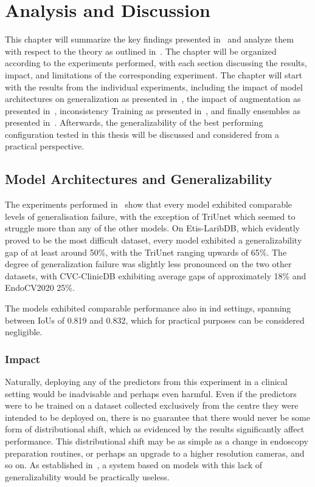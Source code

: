 \chapter{Analysis and Discussion}\label{discussion}
This chapter will summarize the key findings presented in~ and analyze them with respect to the theory as outlined in~. The chapter will be organized according to the experiments performed, with each section discussing the results, impact, and limitations of the corresponding experiment. The chapter will start with the results from the individual experiments, including the impact of model architectures on generalization as presented in~, the impact of augmentation as presented in~, inconsistency Training as presented in~, and finally ensembles as presented in~. Afterwards, the generalizability of the best performing configuration tested in this thesis will be discussed and considered from a practical perspective.


\section{Model Architectures and Generalizability}\label{discussion:models}
The experiments performed in~ show that every model exhibited comparable levels of generalisation failure, with the exception of TriUnet which seemed to struggle more than any of the other models. On Etis-LaribDB, which evidently proved to be the most difficult dataset, every model exhibited a generalizability gap of at least around 50\%, with the TriUnet ranging upwards of 65\%. The degree of generalization failure was slightly less pronounced on the two other datasets, with CVC-ClinicDB exhibiting average gaps of approximately 18\% and EndoCV2020 25\%. 

The models exhibited comparable performance also in \gls{ind} settings, spanning between IoUs of 0.819 and 0.832, which for practical purposes can be considered negligible. 

\subsection{Impact}
Naturally, deploying any of the predictors from this experiment in a clinical setting would be inadvisable and perhaps even harmful. Even if the predictors were to be trained on a dataset collected exclusively from the centre they were intended to be deployed on, there is no guarantee that there would never be some form of distributional shift, which as evidenced by the results significantly affect performance. This distributional shift may be as simple as a change in endoscopy preparation routines, or perhaps an upgrade to a higher resolution cameras, and so on. As established in~, a system based on models with this lack of generalizability would be practically useless. 

